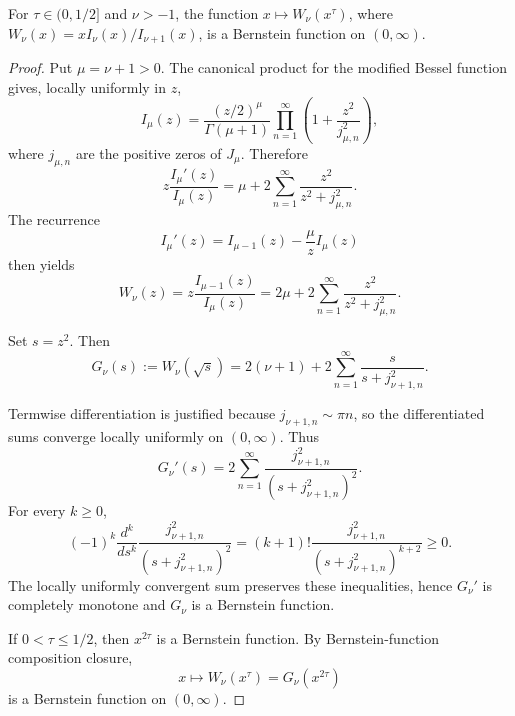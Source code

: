 \begin{proposition}
\label{res:yang-tian-bessel-w-bernstein-conjecture}
For \(\tau\in(0,1/2]\) and \(\nu>-1\), the function \(x\mapsto W_\nu(x^\tau)\), where \(W_\nu(x)=xI_\nu(x)/I_{\nu+1}(x)\), is a Bernstein function on \((0,\infty)\).
\end{proposition}
\begin{proof}
Put \(\mu=\nu+1>0\). The canonical product for the modified Bessel function gives, locally uniformly in \(z\),
\[
I_\mu(z)=\frac{(z/2)^\mu}{\Gamma(\mu+1)}
\prod_{n=1}^{\infty}\left(1+\frac{z^2}{j_{\mu,n}^2}\right),
\]
where \(j_{\mu,n}\) are the positive zeros of \(J_\mu\). Therefore
\[
z\frac{I_\mu'(z)}{I_\mu(z)}
=\mu+2\sum_{n=1}^{\infty}\frac{z^2}{z^2+j_{\mu,n}^2}.
\]
The recurrence
\[
I_\mu'(z)=I_{\mu-1}(z)-\frac{\mu}{z}I_\mu(z)
\]
then yields
\[
W_\nu(z)
=z\frac{I_{\mu-1}(z)}{I_\mu(z)}
=2\mu+2\sum_{n=1}^{\infty}\frac{z^2}{z^2+j_{\mu,n}^2}.
\]

Set \(s=z^2\). Then
\[
G_\nu(s):=W_\nu(\sqrt s)
=2(\nu+1)+2\sum_{n=1}^{\infty}\frac{s}{s+j_{\nu+1,n}^2}.
\]

Termwise differentiation is justified because \(j_{\nu+1,n}\sim \pi n\), so the differentiated sums converge locally uniformly on \((0,\infty)\). Thus
\[
G_\nu'(s)
=2\sum_{n=1}^{\infty}
\frac{j_{\nu+1,n}^2}{(s+j_{\nu+1,n}^2)^2}.
\]
For every \(k\ge0\),
\[
(-1)^k\frac{d^k}{ds^k}
\frac{j_{\nu+1,n}^2}{(s+j_{\nu+1,n}^2)^2}
=
(k+1)!\frac{j_{\nu+1,n}^2}{(s+j_{\nu+1,n}^2)^{k+2}}
\ge0.
\]
The locally uniformly convergent sum preserves these inequalities, hence \(G_\nu'\) is completely monotone and \(G_\nu\) is a Bernstein function.

If \(0<\tau\le1/2\), then \(x^{2\tau}\) is a Bernstein function. By Bernstein-function composition closure,
\[
x\mapsto W_\nu(x^\tau)=G_\nu(x^{2\tau})
\]
is a Bernstein function on \((0,\infty)\).
\end{proof}

